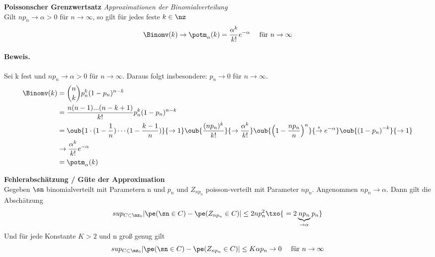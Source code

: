 \begin{satz}
    \textbf{Poissonscher Grenzwertsatz} \textit{Approximationen der Binomialverteilung}  \\
    Gilt $np_n \rightarrow \alpha > 0$ für $ n \rightarrow \infty$, so gilt für jedes feste $k \in \nz$
    \[
        \Binomv(k) \rightarrow \potm_{\alpha}(k) = \frac{\alpha^k}{k!} e^{- \alpha} \quad \text{ für } n \rightarrow \infty
    \]
    \paragraph{Beweis.} Sei k fest und  $np_n \rightarrow \alpha > 0$ für $ n \rightarrow \infty$. Daraus folgt
    insbesondere: $p_n \rightarrow 0$ für $ n \rightarrow \infty$.
    \begin{align*}
        \Binomv(k) & = \binom{n}{k} p_n^k (1-p_n)^{n-k} \\
        & = \frac{n(n - 1) . . . (n - k + 1)}{k!}  p_n^k (1-p_n)^{n-k} \\
        & = \oub{1 \cdot  (1  - \frac{1}{n}) \cdots  (1  - \frac{k-1}{n})}{\rightarrow 1} \oub{\frac{(np_n)^k}{k!}}{
            \rightarrow \frac{\alpha^k}{k!}} \oub{\left(  1 - \frac{np_n}{n} \right)^n }{\overset{*}{\rightarrow} e^{
            -\alpha}} \oub{\left( 1-p_n \right)^{-k}}{\rightarrow 1} \\
        & \rightarrow \frac{\alpha^k}{k!}  e^{-\alpha} \\
        & = \potm_{\alpha} (k)
    \end{align*}
\end{satz}

\begin{bem}
    \textbf{Fehlerabschätzung / Güte der Approximation}  \\
    Gegeben $\sn$ binomialverteilt mit Parametern n und $p_n$ und $Z_{np_n}$ poisson-verteilt mit Parameter $np_n$.
    Angenommen $np_n \rightarrow \alpha$.
    Dann gilt die Abschätzung
    \[
        sup_{C \subset \nz_0} | \pe(\sn \in C) - \pe(Z_{np_n} \in C)| \leq 2np^2_n \txo{\ = 2 \underbrace{np_n}_{\rightarrow \alpha} p_n}
    \]
    Und für jede Konstante $K > 2$ und n groß genug gilt
    \[
        sup_{C \subset \nz_0} | \pe(\sn \in C) - \pe(Z_{np_n} \in C)| \leq K \alpha p_n \rightarrow 0 \quad \text{ für } n \rightarrow \infty
    \]
\end{bem}

